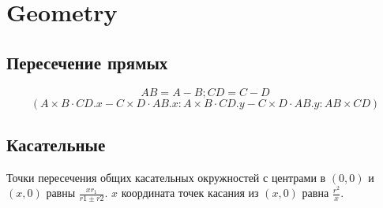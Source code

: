 \section{Geometry}

\subsection{Пересечение прямых}

\begin{equation*}
    AB = A - B; CD = C - D
\end{equation*}
\begin{equation*}
    (A \times B \cdot CD.x - C \times D \cdot AB.x : A \times B \cdot CD.y - C \times D \cdot AB.y : AB \times CD)
\end{equation*}

\subsection{Касательные}

Точки пересечения общих касательных окружностей с центрами в $(0, 0)$ и $(x, 0)$ равны $\frac{x r_1}{r1 \pm r2}$.
$x$ координата точек касания из $(x, 0)$ равна $\frac{r^2}{x}$.
